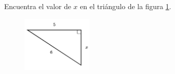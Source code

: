 \question[15]  Encuentra el valor de $x$ en el triángulo de la figura \ref{fig:lados_pitagoras_38}.
\begin{figure}[H]
    \begin{center}
        \includegraphics[width=0.3\textwidth]{../images/lados_pitagoras_38.png}
    \end{center}
    \caption{}
    \label{fig:lados_pitagoras_38}
\end{figure}